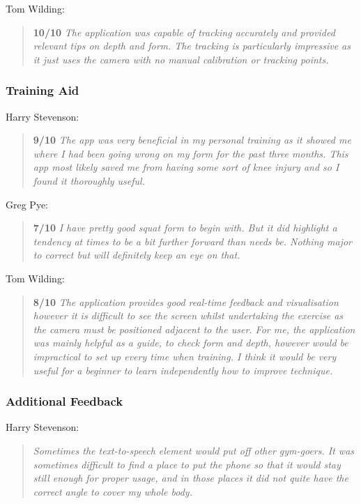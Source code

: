 Tom Wilding:
\begin{quote}
\textbf{10/10} \emph{The application was capable of tracking accurately and provided relevant tips on depth and form. The tracking is particularly impressive as it just uses the camera with no manual calibration or tracking points.}
\end{quote}

\subsubsection{Training Aid}

Harry Stevenson:
\begin{quote}
\textbf{9/10} \emph{The app was very beneficial in my personal training as it showed me where I had been going wrong on my form for the past three months. This app most likely saved me from having some sort of knee injury and so I found it thoroughly useful.}
\end{quote}

Greg Pye:
\begin{quote}
\textbf{7/10} \emph{I have pretty good squat form to begin with. But it did highlight a tendency at times to be a bit further forward than needs be. Nothing major to correct but will definitely keep an eye on that.}
\end{quote}

Tom Wilding:
\begin{quote}
\textbf{8/10} \emph{The application provides good real-time feedback and visualisation however it is difficult to see the screen whilst undertaking the exercise as the camera must be positioned adjacent to the user. For me, the application was mainly helpful as a guide, to check form and depth, however would be impractical to set up every time when training. I think it would be very useful for a beginner to learn independently how to improve technique.}
\end{quote}

\subsubsection{Additional Feedback}

Harry Stevenson:
\begin{quote}
\emph{Sometimes the text-to-speech element would put off other gym-goers. It was sometimes difficult to find a place to put the phone so that it would stay still enough for proper usage, and in those places it did not quite have the correct angle to cover my whole body.}
\end{quote}

